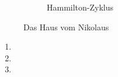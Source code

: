 \documentclass{homework}
\begin{document}
\begin{enumerate}
\begin{figure}[H]
\begin{subfigure}{0.5\linewidth}
\caption{Hammilton-Zyklus}
\label{fig:32b}
\end{subfigure}

\caption{Das Haus vom Nikolaus}
\end{figure}



\begin{enumerate}
\item
\item
\item
\end{enumerate}


\end{enumerate}
\end{document}
